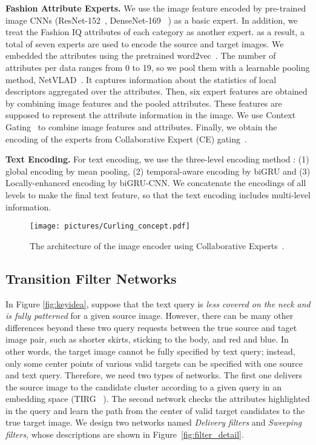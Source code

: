 \documentclass[10pt,twocolumn,letterpaper]{article}
\begin{document}
\textbf{Fashion Attribute Experts.}
We use the image feature encoded by pre-trained image CNNs (\eg ResNet-152~\cite{he-arxiv-2015}, DenseNet-169 ~\cite{huang-cvpr-2017}) as a basic expert.
In addition, we treat the Fashion IQ attributes of each category as another expert.
as a result, a total of seven experts are used to encode the source and target images. 
We embedded the attributes using the pretrained word2vec~\cite{Tomas-nips-2013}.
The number of attributes per data ranges from 0 to 19, so we pool them with a learnable pooling method, NetVLAD~\cite{arand-cvpr-2016}. 
It captures information about the statistics of local descriptors aggregated over the attributes. 
Then, six expert features are obtained by combining image features and the pooled attributes. 
These features are supposed to represent the attribute information in the image.
We use Context Gating~\cite{miech-arxiv-2017} to combine image features and attributes.
Finally, we obtain the encoding of the experts from Collaborative Expert (CE) gating~\cite{Liu-bmvc-2019}.

\textbf{Text Encoding.}
For text encoding, we use the three-level encoding method \cite{dual-cvpr-2019}: (1) global encoding by mean pooling, 	(2) temporal-aware encoding by biGRU and (3) Locally-enhanced encoding by biGRU-CNN.
We concatenate the encodings of all levels to make the final text feature, so that the text encoding includes multi-level information. 

\begin{figure}[t]
\centering
\texttt{[image: pictures/Curling\_concept.pdf]}
\caption{
The architecture of the image encoder using Collaborative Experts~\cite{Liu-bmvc-2019}.
}
\label{fig:curling}
\end{figure}



\subsection{Transition Filter Networks}

In Figure \ref{fig:keyidea}, suppose that the text query is \textit{less covered on the neck and is fully patterned}  for a given source image.
However, there can be many other differences beyond these two query requests between the true source and taget image pair,
such as shorter skirts, sticking to the body, and red and blue.
In other words, the target image cannot be fully specified by text query; instead, only some center points of various valid targets can be specified with one source and text query. 
Therefore, we need two types of networks.
The first one delivers the source image to the candidate cluster according to a given query in an embedding space (\ie TIRG ~\cite{vo-cvpr-2019}).
The second network checks the attributes highlighted in the query and learn the path from the center of valid target candidates to the true target image. 
We design two networks named \textit{Delivery filters} and \textit{Sweeping filters},
whose descriptions are shown in Figure~\ref{fig:filter_detail}.
\end{document}
